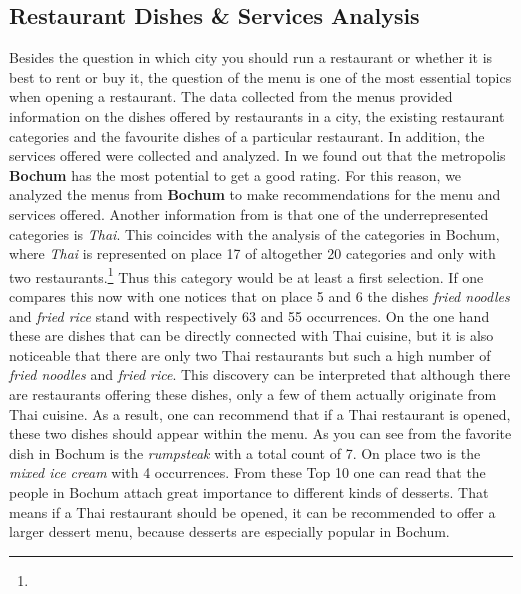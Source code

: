 \subsection{Restaurant Dishes \& Services Analysis}
\label{subsec:menu}
Besides the question in which city you should run a restaurant or whether it is best to rent or buy it,
the question of the menu is one of the most essential topics when opening a restaurant.
\newline
The data collected from the menus provided information on the dishes offered by restaurants in a city,
the existing restaurant categories and the favourite dishes of a particular restaurant.
In addition, the services offered were collected and analyzed.
\newline
In  we found out that the metropolis \textbf{Bochum} has the most potential to get a good rating.
For this reason, we analyzed the menus from \textbf{Bochum} to make recommendations for the menu and services offered.
\newline
Another information from  is that one of the underrepresented categories is \textit{Thai}.
This coincides with the analysis of the categories in Bochum, where \textit{Thai} is represented on place 17 of altogether 20 categories and only with two restaurants.\footnote{}
Thus this category would be at least a first selection.
If one compares this now with  one notices that on place 5 and 6 the dishes \textit{fried noodles} and \textit{fried rice} stand with respectively 63 and 55 occurrences.
On the one hand these are dishes that can be directly connected with Thai cuisine,
but it is also noticeable that there are only two Thai restaurants but such a high number of \textit{fried noodles} and \textit{fried rice}.
This discovery can be interpreted that although there are restaurants offering these dishes, only a few of them actually originate from Thai cuisine.
As a result, one can recommend that if a Thai restaurant is opened, these two dishes should appear within the menu.
As you can see from  the favorite dish in Bochum is the \textit{rumpsteak} with a total count of 7.
On place two is the \textit{mixed ice cream} with 4 occurrences.
From these Top 10 one can read that the people in Bochum attach great importance to different kinds of desserts.
That means if a Thai restaurant should be opened, it can be recommended to offer a larger dessert menu, because desserts are especially popular in Bochum.
\newline
